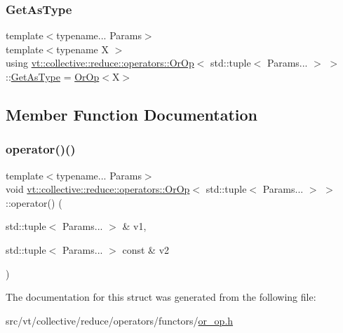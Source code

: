 \subsubsection{\texorpdfstring{Get\+As\+Type}{GetAsType}}
{\footnotesize\ttfamily template$<$typename... Params$>$ \\
template$<$typename X $>$ \\
using \hyperlink{structvt_1_1collective_1_1reduce_1_1operators_1_1_or_op}{vt\+::collective\+::reduce\+::operators\+::\+Or\+Op}$<$ std\+::tuple$<$ Params... $>$ $>$\+::\hyperlink{structvt_1_1collective_1_1reduce_1_1operators_1_1_or_op_3_01std_1_1tuple_3_01_params_8_8_8_01_4_01_4_a1dfc36581d2fea82cac8d1d295ee3681}{Get\+As\+Type} =  \hyperlink{structvt_1_1collective_1_1reduce_1_1operators_1_1_or_op}{Or\+Op}$<$X$>$}



\subsection{Member Function Documentation}
\mbox{\label{structvt_1_1collective_1_1reduce_1_1operators_1_1_or_op_3_01std_1_1tuple_3_01_params_8_8_8_01_4_01_4_a0a4e3d375ae1d0625e0b6226e356abc6}} 
\subsubsection{\texorpdfstring{operator()()}{operator()()}}
{\footnotesize\ttfamily template$<$typename... Params$>$ \\
void \hyperlink{structvt_1_1collective_1_1reduce_1_1operators_1_1_or_op}{vt\+::collective\+::reduce\+::operators\+::\+Or\+Op}$<$ std\+::tuple$<$ Params... $>$ $>$\+::operator() (\begin{DoxyParamCaption}\item[{std\+::tuple$<$ Params... $>$ \&}]{v1,  }\item[{std\+::tuple$<$ Params... $>$ const \&}]{v2 }\end{DoxyParamCaption})\hspace{0.3cm}{\ttfamily [inline]}}



The documentation for this struct was generated from the following file\+:\begin{DoxyCompactItemize}
\item 
src/vt/collective/reduce/operators/functors/\hyperlink{or__op_8h}{or\+\_\+op.\+h}\end{DoxyCompactItemize}

